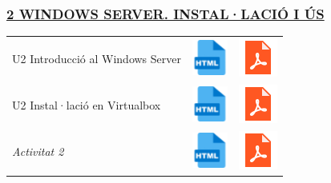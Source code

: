 \documentclass[
  12 pt,
  a4paper,
]{article}
\begin{document}
\subsubsection{\texorpdfstring{\hyperref[U2]{2 WINDOWS SERVER.
INSTAL·LACIÓ I
ÚS}}{2 WINDOWS SERVER. INSTAL·LACIÓ I ÚS}}\label{windows-server.-installaciuxf3-i-uxfas}

\begin{longtable}[]{@{}
  >{\raggedright\arraybackslash}p{}
  >{\raggedright\arraybackslash}p{}
  >{\raggedright\arraybackslash}p{}@{}}
\toprule\noalign{}
\endhead
\bottomrule\noalign{}
\endlastfoot
U2 Introducció al Windows Server &
\href{U2_WS_INSTAL_i_US/U2_WS_INSTAL_i_US.html}{\includegraphics{recursos/iconohtml.png}}
&
\href{U2_WS_INSTAL_i_US/U2_WS_INSTAL_i_US.pdf}{\includegraphics{recursos/iconopdf.png}} \\
U2 Instal·lació en Virtualbox &
\href{U2_WS_INSTAL_i_US(II)/ADDSenWindowsServerGUI.html}{\includegraphics{recursos/iconohtml.png}}
&
\href{U2_WS_INSTAL_i_US(II)/ADDSenWindowsServerGUI.pdf}{\includegraphics{recursos/iconopdf.png}} \\
\emph{Activitat 2} &
\href{U2_Activitat2/U2_Activitat2.html}{\includegraphics{recursos/iconohtml.png}}
&
\href{U2_Activitat2/U2_Activitat2.pdf}{\includegraphics{recursos/iconopdf.png}} \\
\end{longtable}
\end{document}
